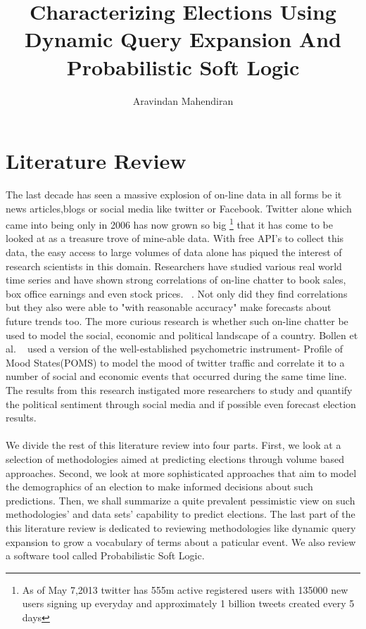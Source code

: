 \documentclass{article}
\begin{document}
\title{Characterizing Elections Using Dynamic Query Expansion And Probabilistic Soft Logic}
\author{Aravindan Mahendiran}
\maketitle
\section{Literature Review}
The last decade has seen a massive explosion of on-line data in all forms be it news articles,blogs
or social media like twitter or Facebook. 
Twitter alone which came into being only in 2006 has now grown so big
\footnote{As of May 7,2013 twitter has 555m active registered users with
135000 new users signing up everyday and approximately 1 billion tweets created every 5 days}
that it has come to be looked at as a treasure trove
of mine-able data.
With free API's to collect this data, the easy access to large volumes of data alone has piqued 
the interest of research scientists in this domain. 
Researchers have studied various real world time series and have shown strong correlations of 
on-line chatter to book sales, box office earnings and even stock prices.
~\cite{gruhl2005predictive,asur2010predicting,bollen2011twitter}. Not only did they 
find correlations but they also were able to "with reasonable accuracy" make forecasts about future
trends too. 
The more curious research is whether such on-line chatter be used to model the social, economic
and political landscape of a country. 
Bollen et al. ~\cite{bollen2011modeling} used a version of the well-established psychometric 
instrument- Profile of Mood States(POMS) to model the mood of twitter traffic and correlate it to
a number of social and economic events that occurred during the same time line. 
The results from this research instigated more researchers to study and quantify the political 
sentiment through social media and if possible even forecast election results.
\paragraph{}
We divide the rest of this literature review into four parts. 
First, we look at a selection of methodologies aimed at predicting elections through
volume based approaches. 
Second, we look at more sophisticated approaches that aim to model the demographics of an election
to make informed decisions about such predictions. 
Then, we shall summarize a quite prevalent pessimistic view on such methodologies' 
and data sets' capability to predict elections. 
The last part of the this literature review is dedicated to reviewing methodologies like dynamic
query expansion to grow a vocabulary of terms about a paticular event. We also review a software
tool called Probabilistic Soft Logic.
\end{document}

